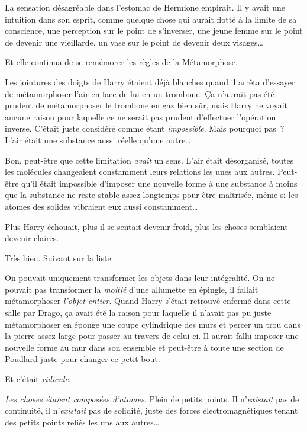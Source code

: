La sensation désagréable dans l'estomac de Hermione empirait. Il y avait une intuition dans son esprit, comme quelque chose qui aurait flotté à la limite de sa conscience, une perception sur le point de s'inverser, une jeune femme sur le point de devenir une vieillarde, un vase sur le point de devenir deux visages…

Et elle continua de se remémorer les règles de la Métamorphose.

\later

Les jointures des doigts de Harry étaient déjà blanches quand il arrêta d'essayer de métamorphoser l'air en face de lui en un trombone. Ça n'aurait pas été prudent de métamorphoser le trombone en gaz bien sûr, mais Harry ne voyait aucune raison pour laquelle ce ne serait pas prudent d'effectuer l'opération inverse. C'était juste considéré comme étant \emph{impossible}. Mais pourquoi pas~? L'air était une substance aussi réelle qu'une autre…

Bon, peut-être que cette limitation \emph{avait} un sens. L'air était désorganisé, toutes les molécules changeaient constamment leurs relations les unes aux autres. Peut-être qu'il était impossible d'imposer une nouvelle forme à une substance à moins que la substance ne reste stable assez longtemps pour être maîtrisée, même si les atomes des solides vibraient eux aussi constamment…

Plus Harry échouait, plus il se sentait devenir froid, plus les choses semblaient devenir claires.

Très bien. Suivant sur la liste.

On pouvait uniquement transformer les objets dans leur intégralité. On ne pouvait pas transformer la \emph{moitié} d'une allumette en épingle, il fallait métamorphoser \emph{l'objet entier}. Quand Harry s'était retrouvé enfermé dans cette salle par Drago, ça avait été la raison pour laquelle il n'avait pas pu juste métamorphoser en éponge une coupe cylindrique des murs et percer un trou dans la pierre assez large pour passer au travers de celui-ci. Il aurait fallu imposer une nouvelle forme au mur dans son ensemble et peut-être à toute une section de Poudlard juste pour changer ce petit bout.

Et c'était \emph{ridicule}.

\emph{Les choses étaient composées d'atomes}. Plein de petits points. Il n'\emph{existait} pas de continuité, il n'\emph{existait} pas de solidité, juste des forces électromagnétiques tenant des petits points reliés les uns aux autres…

